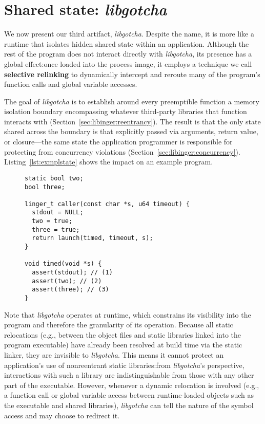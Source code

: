 \section{Shared state: \textit{libgotcha}}
\label{sec:libgotcha}

We now present our third artifact, \textit{libgotcha}.
Despite the name, it is more like a runtime that isolates hidden shared state
within an application.  Although the rest of the
program does not interact directly with \textit{libgotcha}, its presence has a
global effect:\@ once loaded into the process image, it employs a technique we call
\textbf{selective relinking} to dynamically intercept and reroute many of the
program's function
calls and global variable accesses.

The goal of \textit{libgotcha} is to establish around every preemptible function a
memory isolation boundary encompassing whatever third-party libraries that function
interacts with (Section~\ref{sec:libinger:reentrancy}).  The result is that the only
state shared across the boundary is that explicitly passed via arguments,
return value, or closure---the same state the application programmer is responsible
for protecting from concurrency violations (Section~\ref{sec:libinger:concurrency}).
Listing~\ref{lst:exmplstate} shows the impact on an example program.

\begin{figure}
\begin{lstlisting}[label=lst:exmplstate,caption=Demo of isolated \textnormal{(1)} vs.\ shared \textnormal{(2\&3)} state]
static bool two;
bool three;

linger_t caller(const char *s, u64 timeout) {
  stdout = NULL;
  two = true;
  three = true;
  return launch(timed, timeout, s);
}

void timed(void *s) {
  assert(stdout); // (1)
  assert(two); // (2)
  assert(three); // (3)
}
\end{lstlisting}
\end{figure}

Note that \textit{libgotcha} operates at runtime, which constrains its visibility
into the program and therefore the granularity of its operation.  Because all static
relocations (e.g., between the object files and static libraries linked into the
program executable) have already been resolved at build time via the static linker,
they are invisible to \textit{libgotcha}.  This means it cannot protect an
application's use of nonreentrant static libraries:\@ from \textit{libgotcha}'s
perspective, interactions with such a library are indistinguishable from those with
any other part of the executable.  However, whenever a dynamic relocation is involved
(e.g., a function call or global variable access between runtime-loaded objects such
as the executable and shared libraries), \textit{libgotcha} can tell the nature of
the symbol access and may choose to redirect it.

